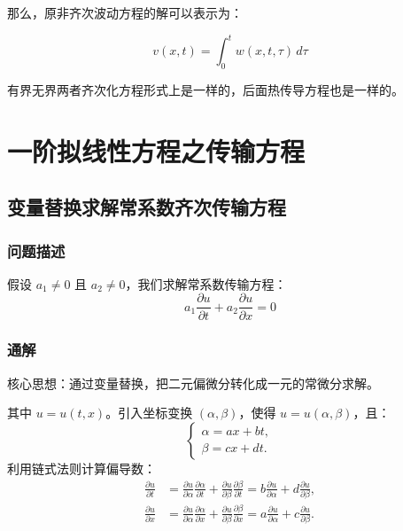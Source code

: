 \documentclass[12pt,a4paper]{article}
\numberwithin{subsection}{section}   %
\numberwithin{subsubsection}{subsection}
\theoremstyle{plain}
\theoremstyle{definition}
\theoremstyle{remark}
\theoremstyle{remark}
\begin{document}
	那么，原非齐次波动方程的解可以表示为：
	
\begin{equation}
	v(x, t) = \int_0^t w(x, t, \tau) \, d\tau
\end{equation}
	
	有界无界两者齐次化方程形式上是一样的，后面热传导方程也是一样的。
	
	
	
	
	
	
	\section{一阶拟线性方程之传输方程} 
	\subsection{变量替换求解常系数齐次传输方程} 
	\subsubsection{问题描述}
	
	
	假设 $a_1 \neq 0$ 且 $a_2 \neq 0$，我们求解常系数传输方程：
	\begin{equation} \label{eq:pde_original}
		a_1 \frac{\partial u}{\partial t} + a_2 \frac{\partial u}{\partial x} = 0
	\end{equation}
	
	\subsubsection{通解} 
	核心思想：通过变量替换，把二元偏微分转化成一元的常微分求解。
	
	其中 $u = u(t,x)$。引入坐标变换 $(\alpha, \beta)$，使得 $u = u(\alpha, \beta)$，且：
	\begin{equation} \label{eq:coordinate_transform}
		\begin{cases}
			\alpha = ax + bt, \\
			\beta = cx + dt.
		\end{cases}
	\end{equation}
	利用链式法则计算偏导数：
	\begin{align}
		\frac{\partial u}{\partial t} 
		&= \frac{\partial u}{\partial \alpha} \frac{\partial \alpha}{\partial t} + \frac{\partial u}{\partial \beta} \frac{\partial \beta}{\partial t} 
		= b\frac{\partial u}{\partial \alpha} + d\frac{\partial u}{\partial \beta}, \label{eq:u_t_chain_rule} \\
		\frac{\partial u}{\partial x} 
		&= \frac{\partial u}{\partial \alpha} \frac{\partial \alpha}{\partial x} + \frac{\partial u}{\partial \beta} \frac{\partial \beta}{\partial x} 
		= a\frac{\partial u}{\partial \alpha} + c\frac{\partial u}{\partial \beta}. \label{eq:u_x_chain_rule}
	\end{align}
	
\end{document}
